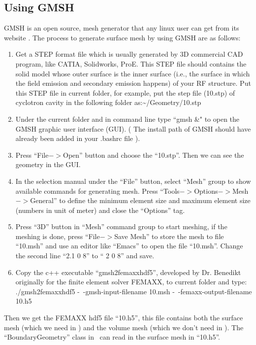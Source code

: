 \documentclass[a4paper,11pt]{article}
\begin{document}
\subsection{Using GMSH}
GMSH is an open source, mesh generator that any linux user can get from its website \cite{gmsh}. The process to generate surface mesh by using GMSH are as follows:
\begin{enumerate}
    \item Get a STEP format file which is usually generated by 3D commercial CAD program, like CATIA, Solidworks, ProE. This STEP file should contains the solid model whose outer surface is the inner surface (i.e., the surface in which the field emission and secondary emission happens) of your RF structure. Put this STEP file in current folder, for example, put the step file (10.stp) of cyclotron cavity in the following folder as:\~{}/Geometry/10.stp   
    \item Under the current folder and in command line type ``gmsh \&" to open the GMSH graphic user interface (GUI). ( The install path of GMSH should have already been added in your .bashrc file ). 
    \item Press ``File$->$Open'' button and choose the ``10.stp''. Then we can see the geometry in the GUI.  
    \item In the selection manual under the ``File'' button, select ``Mesh'' group to show available commands for generating mesh. Press ``Tools$->$Options$->$Mesh$->$General'' to define the minimum element size and maximum element size (numbers in unit of meter) and close the ``Options'' tag.
    \item Press ``3D'' button in ``Mesh'' command group to start meshing, if the meshing is done, press ``File$->$Save Mesh'' to store the mesh to file ``10.msh'' and use an editor like ``Emacs'' to open the file ``10.msh''. Change the second line ``2.1 0 8'' to `` 2 0 8'' and save.
    \item Copy the c++ executable ``gmsh2femaxxhdf5'', developed by Dr. Benedikt originally for the finite element solver FEMAXX, to current folder and type:\\
./gmsh2femaxxhdf5 -~-gmsh-input-filename 10.msh -~-femaxx-output-filename 10.h5
\end{enumerate}

Then we get the FEMAXX hdf5 file ``10.h5'', this file contains both the surface mesh (which we need in \opal ) and the volume mesh (which we don't need in \opal ). The ``BoundaryGeometry'' class in \opal\ can read in the surface mesh in ``10.h5''.\\
\end{document}
